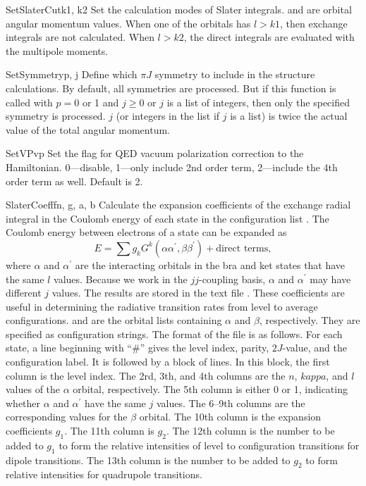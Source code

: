 \begin{fundesc}{SetSlaterCut}{k1, k2}
Set the calculation modes of Slater integrals.  and  are orbital
angular momentum values. When one of the orbitals has $l > k1$, then exchange
integrals are not calculated. When $l > k2$, the direct integrals are evaluated
with the multipole moments.
\end{fundesc}

\begin{fundesc}{SetSymmetry}{p, j}
Define which $\pi J$ symmetry to include in the structure calculations. By
default, all symmetries are processed. But if this function is called with $p=0$
or 1 and $j \ge 0$ or $j$ is a list of integers, then only the specified
symmetry is processed. $j$ (or integers in the list if $j$ is a list) is twice
the actual value of the total angular momentum.
\end{fundesc}

\begin{fundesc}{SetVP}{vp}
Set the flag for QED vacuum polarization correction to the Hamiltonian.
0---disable, 1---only include 2nd order term, 2---include the 4th order term as
well. Default is 2.
\end{fundesc}

\begin{fundesc}{SlaterCoeff}{fn, g, a, b}
Calculate the expansion coefficients of the exchange radial integral in the
Coulomb energy of each state in the configuration list  . The Coulomb
energy between electrons of a state can be expanded as
\begin{equation}
E = \sum g_kG^k(\alpha\alpha^\prime,\beta\beta^\prime) + \mbox{direct terms},
\end{equation}
where $\alpha$ and $\alpha^\prime$ are the interacting orbitals in the bra and
ket states that have the same $l$ values. Because we work in the $jj$-coupling
basis, $\alpha$ and $\alpha^\prime$ may have different $j$ values. The results
are stored in the text file . These coefficients are useful in
determining the radiative transition rates from level to average configurations.
 and  are the orbital lists containing $\alpha$ and $\beta$,
respectively. They are specified as configuration strings. The format of the
file is as follows. For each state, a line beginning with ``\#'' gives the level
index, parity, $2J$-value, and the configuration label. It is followed by a
block of lines. In this block, the first column is the level index. The 2rd,
3th, and 4th columns are the $n$, $kappa$, and $l$ values of the $\alpha$
orbital, respectively. The 5th column is either 0 or 1, indicating whether
$\alpha$ and $\alpha^\prime$ have the same $j$ values. The 6--9th  columns are
the corresponding values for the $\beta$ orbital. The 10th column is the
expansion coefficients $g_1$. The 11th column is $g_2$. The 12th column is the
number to be added to $g_1$ to form the relative intensities of level to
configuration transitions for dipole transitions. The 13th column is the number
to be added to $g_2$ to form relative intensities for quadrupole transitions.
\end{fundesc}

